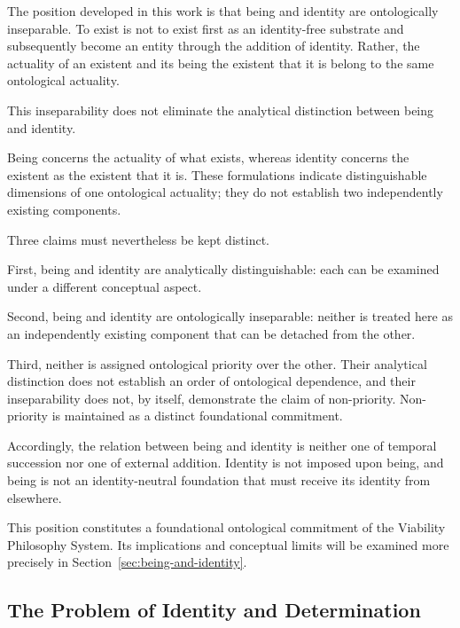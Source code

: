 The position developed in this work is that
being and identity are ontologically inseparable.
To exist is not to exist first as an identity-free
substrate and subsequently become an entity
through the addition of identity. Rather,
the actuality of an existent and its being
the existent that it is belong to the same
ontological actuality.

This inseparability does not eliminate the
analytical distinction between being and identity.

Being concerns the actuality of what exists,
whereas identity concerns the existent as
the existent that it is. These formulations
indicate distinguishable dimensions of one
ontological actuality; they do not establish
two independently existing components.

Three claims must nevertheless be kept distinct.

First, being and identity are analytically
distinguishable: each can be examined under
a different conceptual aspect.

Second, being and identity are ontologically
inseparable: neither is treated here as an
independently existing component that can
be detached from the other.

Third, neither is assigned ontological priority
over the other. Their analytical distinction
does not establish an order of ontological
dependence, and their inseparability does
not, by itself, demonstrate the claim of
non-priority. Non-priority is maintained
as a distinct foundational commitment.

Accordingly, the relation between being and
identity is neither one of temporal succession
nor one of external addition. Identity is not
imposed upon being, and being is not an
identity-neutral foundation that must receive
its identity from elsewhere.

This position constitutes a foundational
ontological commitment of the Viability
Philosophy System. Its implications and
conceptual limits will be examined more
precisely in Section~\ref{sec:being-and-identity}.



\subsection{The Problem of Identity and Determination}

